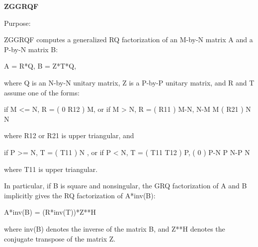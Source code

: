 {\bfseries Z\+G\+G\+R\+Q\+F} 

 \begin{DoxyParagraph}{Purpose\+: }
\begin{DoxyVerb} ZGGRQF computes a generalized RQ factorization of an M-by-N matrix A
 and a P-by-N matrix B:

             A = R*Q,        B = Z*T*Q,

 where Q is an N-by-N unitary matrix, Z is a P-by-P unitary
 matrix, and R and T assume one of the forms:

 if M <= N,  R = ( 0  R12 ) M,   or if M > N,  R = ( R11 ) M-N,
                  N-M  M                           ( R21 ) N
                                                      N

 where R12 or R21 is upper triangular, and

 if P >= N,  T = ( T11 ) N  ,   or if P < N,  T = ( T11  T12 ) P,
                 (  0  ) P-N                         P   N-P
                    N

 where T11 is upper triangular.

 In particular, if B is square and nonsingular, the GRQ factorization
 of A and B implicitly gives the RQ factorization of A*inv(B):

              A*inv(B) = (R*inv(T))*Z**H

 where inv(B) denotes the inverse of the matrix B, and Z**H denotes the
 conjugate transpose of the matrix Z.\end{DoxyVerb}
 
\end{DoxyParagraph}

